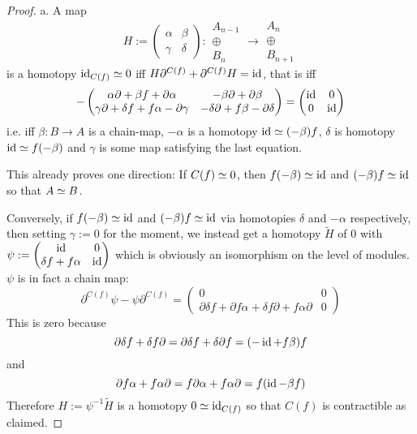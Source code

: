\documentclass[fontsize=11pt,fleqn,a4paper]{scrartcl}
\begin{document}
\begin{proof}
a. A map
\[H:=\begin{pmatrix}
\alpha & \beta \\ \gamma & \delta
\end{pmatrix} : \begin{array}{c}A_{n-1}\\\oplus\\B_n\end{array} \to \begin{array}{c}A_n \\\oplus\\ B_{n+1}\end{array}\]
is a homotopy $\operatorname{id}_{C(f)} \simeq 0$ iff $H\partial^{C(f)} + \partial^{C(f)} H = \operatorname{id}$, that is iff
\[-\begin{pmatrix}
\alpha\partial + \beta f + \partial\alpha & -\beta\partial + \partial\beta \\
\gamma\partial + \delta f + f\alpha-\partial\gamma & -\delta\partial + f\beta - \partial\delta
\end{pmatrix} = \begin{pmatrix}
\operatorname{id} & 0 \\ 0 & \operatorname{id}
\end{pmatrix}\]
i.e. iff $\beta: B\to A$ is a chain-map, $-\alpha$ is a homotopy $\operatorname{id}\simeq(-\beta) f$, $\delta$ is homotopy $\operatorname{id}\simeq f(-\beta)$ and $\gamma$ is some map satisfying the last equation.

This already proves one direction: If $C(f) \simeq 0$, then $f(-\beta) \simeq \operatorname{id}$ and $(-\beta) f \simeq\operatorname{id}$ so that $A\simeq B$.

\medbreak
Conversely, if $f(-\beta) \simeq \operatorname{id}$ and $(-\beta)f \simeq \operatorname{id}$ via homotopies $\delta$ and $-\alpha$ respectively, then setting $\gamma:=0$ for the moment, we instead get a homotopy $\tilde{H}$ of $0$ with $\psi:=\begin{pmatrix}
\operatorname{id} & 0 \\ \delta f + f\alpha & \operatorname{id}
\end{pmatrix}$ which is obviously an isomorphism on the level of modules. $\psi$ is in fact a chain map:
\[\partial^{C(f)} \psi - \psi \partial^{C(f)} = \begin{pmatrix}
0 & 0 \\ \partial\delta f + \partial f\alpha + \delta f\partial + f\alpha\partial & 0
\end{pmatrix}\]
This is zero because
\[\partial\delta f + \delta f \partial = \partial\delta f + \delta \partial f = (-\operatorname{id}+f\beta)f\]
and
\[\partial f \alpha + f\alpha\partial = f\partial\alpha+f\alpha\partial = f(\operatorname{id}-\beta f)\]
Therefore $H:=\psi^{-1}\tilde{H}$ is a homotopy $0\simeq \operatorname{id}_{C(f)}$ so that $C(f)$ is contractible as claimed.


\end{proof}
\end{document}

